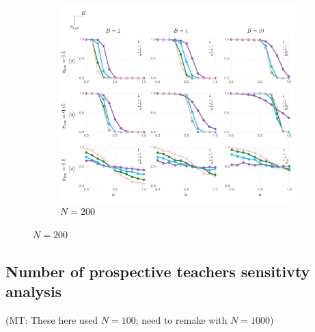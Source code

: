 \documentclass[letterpaper,11.5pt]{scrartcl}
\newcommand{\mt}[1]{{\textcolor{myorange} {({\tiny MT:} #1)}}}
\begin{document}
\begin{figure}
  \ContinuedFloat
	\begin{subfigure}{\textwidth}
	  \caption{$N=200$}
	  \includegraphics[width=\textwidth]{Figures/supplement/nagents=200/mainResultsPlots.pdf}
	\end{subfigure}
\end{figure}


\newpage
\subsection{Number of prospective teachers sensitivty analysis}

\mt{These here used $N=100$; need to remake with $N=1000$}
\end{document}
